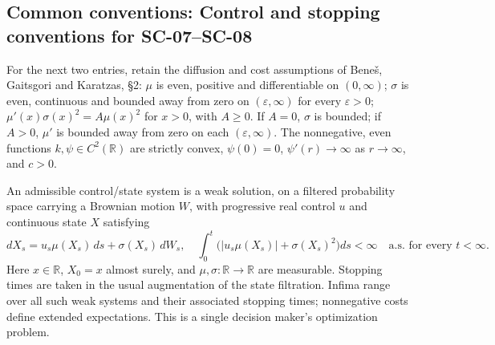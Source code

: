 \documentclass[11pt,a4paper]{article}
\newcommand{\R}{\mathbb R}
\begin{document}
\subsection*{Common conventions: Control and stopping conventions for SC-07--SC-08}

For the next two entries, retain the diffusion and cost assumptions of
Bene\v{s}, Gaitsgori and Karatzas, \S2: $\mu$ is even, positive and
differentiable on $(0,\infty)$; $\sigma$ is even, continuous and bounded
away from zero on $(\varepsilon,\infty)$ for every $\varepsilon>0$;
$\mu'(x)\sigma(x)^2=A\mu(x)^2$ for $x>0$, with $A\geq0$.
If $A=0$, $\sigma$ is bounded; if $A>0$, $\mu'$ is bounded away from
zero on each $(\varepsilon,\infty)$. The nonnegative, even functions
$k,\psi\in C^2(\R)$ are strictly convex, $\psi(0)=0$,
$\psi'(r)\to\infty$ as $r\to\infty$, and $c>0$.

An admissible control/state system is a weak solution, on a filtered
probability space carrying a Brownian motion $W$, with progressive real
control $u$ and continuous state $X$ satisfying
\[
 dX_s=u_s\mu(X_s)\,ds+\sigma(X_s)\,dW_s,
 \quad
 \int_0^t\bigl(|u_s\mu(X_s)|+\sigma(X_s)^2\bigr)ds<\infty
 \quad\text{a.s. for every }t<\infty.
\]
Here $x\in\R$, $X_0=x$ almost surely, and $\mu,\sigma:\R\to\R$ are measurable.
Stopping times are taken in the usual augmentation of the state
filtration. Infima range over all such weak systems and their associated
stopping times; nonnegative costs define extended expectations.
This is a single decision maker's optimization problem.
\end{document}
